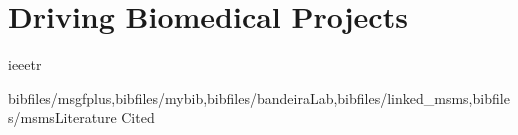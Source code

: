 \section{Driving Biomedical Projects}



%
%
{ieeetr}

%
%
{bibfiles/msgfplus,bibfiles/mybib,bibfiles/bandeiraLab,bibfiles/linked_msms,bibfiles/msms}{Literature Cited}


